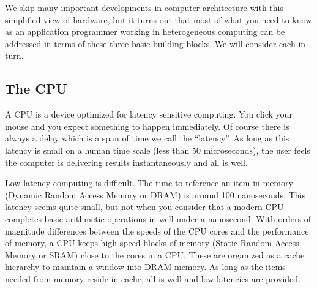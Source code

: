 We skip many important developments in computer architecture with this simplified view of hardware, but 
it turns out that most of what you need to know as an application programmer working in 
heterogeneous computing can be addressed in terms of these three basic building blocks.
We will consider each in turn.

\subsection{The CPU}


A CPU is a device optimized for latency sensitive computing.  You click your mouse and you expect something to happen
immediately.  Of course there is always a delay which is a span of time we call the ``latency''.  As long as this
latency is small on a human time scale (less than 50 microseconds), the user feels the computer is delivering results
instantaneously and  all is well.  

Low latency computing is difficult.  The time to reference an item in memory (Dynamic Random Access Memory or DRAM) is around 100 nanoseconds.  This latency
seems quite small, but not when you consider that a modern CPU completes basic arithmetic operations in well
under a nanosecond.  With orders of magnitude differences between the speeds of the CPU cores and the performance
of memory, a CPU keeps high speed blocks of memory (Static Random Access Memory or SRAM) close to the cores in a CPU.  These are organized as a 
cache hierarchy to maintain a window into DRAM memory.  As long as the items needed from memory 
reside in cache, all is well and low latencies are provided.  

